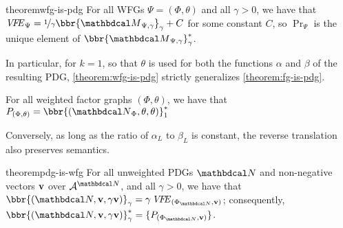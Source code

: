 \begin{linked}{theorem}{wfg-is-pdg}
For all WFGs $\Psi = (\Phi,\theta)$ and all $\gamma > 0$,
we have that
$\VFE_\Psi
= \nicefrac1{\gamma} \bbr{{\dg M}_{\Psi,\gamma}}_{\gamma} 
+ C$   
for some constant $C$, so
$\Pr_{\Psi}$ is the unique element of
$\bbr{{\dg M}_{\Psi,\gamma}}_{\gamma}^*$.
\end{linked}

In particular, for $k\!=\!1$, so that $\theta$ is used for both the functions
$\alpha$ and $\beta$ of the resulting PDG,
\cref{theorem:wfg-is-pdg} strictly generalizes \cref{theorem:fg-is-pdg}.
\begin{coro}
	For all weighted factor graphs $(\Phi, \theta)$,
	we have that
	$\Pr_{(\Phi,\theta)} = \bbr{(\UPDGof{\Phi}, \theta,\theta)}_1^*$
\end{coro}

Conversely, as long as the ratio of $\alpha_L$ to $\beta_L$ is constant, the
reverse translation also preserves semantics.
\begin{linked}{theorem}{pdg-is-wfg}
For all unweighted PDGs $\dg{N}$ and non-negative vectors $\mathbf v$
over $\Ar^{\dg N}$, and all $\gamma > 0$, we have that 
$\bbr{(\dg N, \mat v, \gamma \mat v)}_{\gamma}
= \gamma\,\VFE_{(\Phi_{\dg N}, \mat v)} $; consequently,
$\bbr{(\dg N,  \mat v,  \gamma\mat v)}_{\gamma}^*
		= \{\Pr_{(\Phi_{\dg N}, \mat v)} \}$. 
\end{linked}







